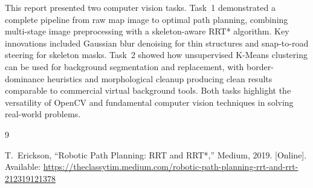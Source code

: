 \documentclass[conference,twocolumn]{IEEEtran}
\begin{document}
This report presented two computer vision tasks. Task~1 demonstrated a complete pipeline from raw map image to optimal path planning, combining multi-stage image preprocessing with a skeleton-aware RRT* algorithm. Key innovations included Gaussian blur denoising for thin structures and snap-to-road steering for skeleton masks. Task~2 showed how unsupervised K-Means clustering can be used for background segmentation and replacement, with border-dominance heuristics and morphological cleanup producing clean results comparable to commercial virtual background tools. Both tasks highlight the versatility of OpenCV and fundamental computer vision techniques in solving real-world problems.

\begin{thebibliography}{9}

T.~Erickson, ``Robotic Path Planning: RRT and RRT*,'' Medium, 2019. [Online]. Available: \url{https://theclassytim.medium.com/robotic-path-planning-rrt-and-rrt-212319121378}

\end{thebibliography}
\end{document}
